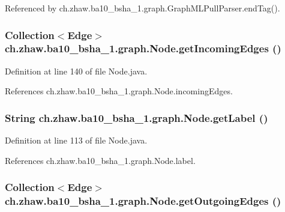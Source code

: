 Referenced by ch.zhaw.ba10\_\-bsha\_\-1.graph.GraphMLPullParser.endTag().\hypertarget{classch_1_1zhaw_1_1ba10__bsha__1_1_1graph_1_1Node_a315d8069f8d2d0b8d50bbc2b5e57144b}{
\subsubsection[{getIncomingEdges}]{\setlength{\rightskip}{0pt plus 5cm}Collection$<${\bf Edge}$>$ ch.zhaw.ba10\_\-bsha\_\-1.graph.Node.getIncomingEdges ()}}
\label{classch_1_1zhaw_1_1ba10__bsha__1_1_1graph_1_1Node_a315d8069f8d2d0b8d50bbc2b5e57144b}


Definition at line 140 of file Node.java.

References ch.zhaw.ba10\_\-bsha\_\-1.graph.Node.incomingEdges.\hypertarget{classch_1_1zhaw_1_1ba10__bsha__1_1_1graph_1_1Node_a0175cf0a68d3cb8e43579638f4ccc264}{
\subsubsection[{getLabel}]{\setlength{\rightskip}{0pt plus 5cm}String ch.zhaw.ba10\_\-bsha\_\-1.graph.Node.getLabel ()}}
\label{classch_1_1zhaw_1_1ba10__bsha__1_1_1graph_1_1Node_a0175cf0a68d3cb8e43579638f4ccc264}


Definition at line 113 of file Node.java.

References ch.zhaw.ba10\_\-bsha\_\-1.graph.Node.label.\hypertarget{classch_1_1zhaw_1_1ba10__bsha__1_1_1graph_1_1Node_a6261a952f89dfff7e010c3ddc4a730d8}{
\subsubsection[{getOutgoingEdges}]{\setlength{\rightskip}{0pt plus 5cm}Collection$<${\bf Edge}$>$ ch.zhaw.ba10\_\-bsha\_\-1.graph.Node.getOutgoingEdges ()}}
\label{classch_1_1zhaw_1_1ba10__bsha__1_1_1graph_1_1Node_a6261a952f89dfff7e010c3ddc4a730d8}


